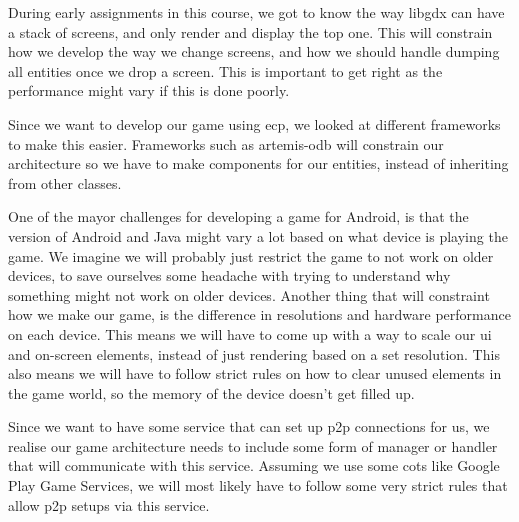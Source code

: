 
During early assignments in this course, we got to know the way \gls{libgdx} can have a stack of screens, and only render and display the top one. This will constrain how we develop the way we change screens, and how we should handle dumping all entities once we drop a screen. This is important to get right as the performance might vary if this is done poorly.

Since we want to develop our game using \gls{ecp}, we looked at different frameworks to make this easier. Frameworks such as artemis-odb will constrain our architecture so we have to make components for our entities, instead of inheriting from other classes.

One of the mayor challenges for developing a game for Android, is that the version of Android and Java might vary a lot based on what device is playing the game. We imagine we will probably just restrict the game to not work on older devices, to save ourselves some headache with trying to understand why something might not work on older devices. Another thing that will constraint how we make our game, is the difference in resolutions and hardware performance on each device. This means we will have to come up with a way to scale our \gls{ui} and on-screen elements, instead of just rendering based on a set resolution. This also means we will have to follow strict rules on how to clear unused elements in the game world, so the memory of the device doesn't get filled up.

Since we want to have some service that can set up \gls{p2p} connections for us, we realise our game architecture needs to include some form of manager or handler that will communicate with this service. Assuming we use some \gls{cots} like Google Play Game Services, we will most likely have to follow some very strict rules that allow \gls{p2p} setups via this service.
